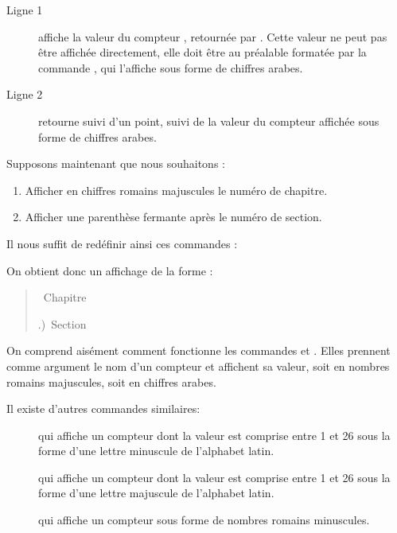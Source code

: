 \begin{description}
\item[Ligne 1] affiche la valeur  du compteur , retournée par . Cette valeur ne peut pas être affichée directement, elle doit être au préalable formatée par la commande , qui l'affiche sous forme de chiffres arabes.
\item[Ligne 2] retourne  suivi d'un point, suivi de la valeur du compteur  affichée sous forme de chiffres arabes.
\end{description}

Supposons maintenant que nous souhaitons  :
\begin{enumerate}
\item Afficher en chiffres romains majuscules le numéro de chapitre.
\item Afficher une parenthèse fermante après le numéro de section.
\end{enumerate}

Il nous suffit de redéfinir ainsi ces commandes :

\begin{latexcode}
\renewcommand\thechapter{\Roman{chapter}}
\renewcommand\thesection{\arabic{section}}
\end{latexcode}






On obtient donc un affichage de la forme :


\makeatletter
\let\oldthechapter\thechapter
\let\oldthesection\thesection
\renewcommand \thechapter {\@Roman\c@chapter}
\renewcommand \thesection {\thechapter.\@arabic\c@section)}
\makeatother
\begin{quotation}
\thechapter~Chapitre

\thesection~Section
\end{quotation}
\renewcommand{\thechapter}{\oldthechapter}
\renewcommand{\thesection}{\oldthesection}

On comprend aisément comment fonctionne les commandes  et . Elles prennent comme argument le nom d'un compteur et affichent sa valeur, soit en nombres romains majuscules, soit en chiffres arabes.

Il existe d'autres commandes similaires:
\begin{description}
 \item[]qui affiche un compteur dont la valeur est comprise entre 1 et 26 sous la forme d'une lettre minuscule de l'alphabet latin.
  \item[]qui affiche un compteur dont la valeur est comprise entre 1 et 26 sous la forme d'une lettre majuscule de l'alphabet latin.
 \item[]qui affiche un compteur sous forme de nombres romains minuscules.
\end{description}

